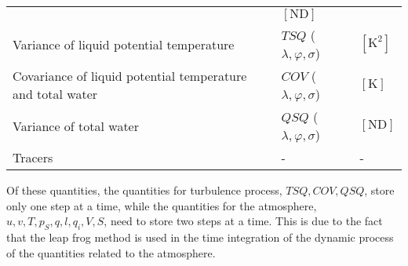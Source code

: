 \begin{longtable}[]{@{}lll@{}}
\begin{minipage}[t]{0.27\columnwidth}
\end{minipage} & \begin{minipage}[t]{0.15\columnwidth}\raggedright
\(\mathrm{[ND]}\)\strut
\end{minipage}\tabularnewline
\begin{minipage}[t]{0.49\columnwidth}\raggedright
Variance of liquid potential temperature\strut
\end{minipage} & \begin{minipage}[t]{0.27\columnwidth}\raggedright
\(TSQ\) (\(\lambda,\varphi,\sigma\))\strut
\end{minipage} & \begin{minipage}[t]{0.15\columnwidth}\raggedright
\(\mathrm{[K^2]}\)\strut
\end{minipage}\tabularnewline
\begin{minipage}[t]{0.49\columnwidth}\raggedright
Covariance of liquid potential temperature and total water\strut
\end{minipage} & \begin{minipage}[t]{0.27\columnwidth}\raggedright
\(COV\) (\(\lambda,\varphi,\sigma\))\strut
\end{minipage} & \begin{minipage}[t]{0.15\columnwidth}\raggedright
\(\mathrm{[K]}\)\strut
\end{minipage}\tabularnewline
\begin{minipage}[t]{0.49\columnwidth}\raggedright
Variance of total water\strut
\end{minipage} & \begin{minipage}[t]{0.27\columnwidth}\raggedright
\(QSQ\) (\(\lambda,\varphi,\sigma\))\strut
\end{minipage} & \begin{minipage}[t]{0.15\columnwidth}\raggedright
\(\mathrm{[ND]}\)\strut
\end{minipage}\tabularnewline
\begin{minipage}[t]{0.49\columnwidth}\raggedright
Tracers\strut
\end{minipage} & \begin{minipage}[t]{0.27\columnwidth}\raggedright
-\strut
\end{minipage} & \begin{minipage}[t]{0.15\columnwidth}\raggedright
-\strut
\end{minipage}\tabularnewline
\bottomrule
\end{longtable}

Of these quantities, the quantities for turbulence process,
\(TSQ, COV, QSQ\), store only one step at a time, while the quantities
for the atmosphere, \(u, v, T, p_S, q, l, q_i, V, S\), need to store two
steps at a time. This is due to the fact that the leap frog method is
used in the time integration of the dynamic process of the quantities
related to the atmosphere.

